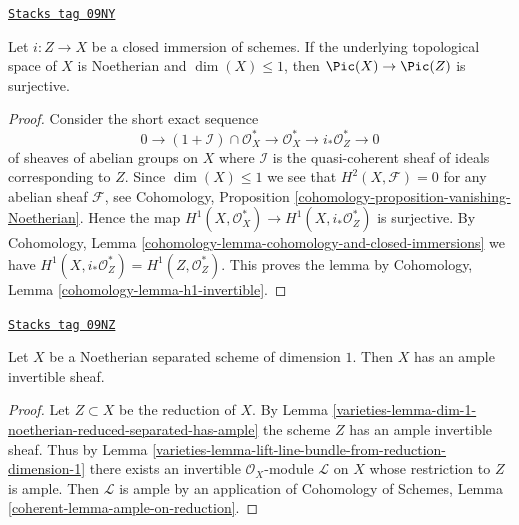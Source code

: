 \begin{lemma}
\label{varieties-lemma-lift-line-bundle-from-reduction-dimension-1}
\href{https://stacks.math.columbia.edu/tag/09NY}{\texttt{Stacks tag 09NY}}

Let $i : Z \to X$ be a closed immersion of schemes.
If the underlying topological space of $X$ is Noetherian and
$\dim(X) \leq 1$, then $\Pic(X) \to \Pic(Z)$ is surjective.
\end{lemma}

\begin{proof}
Consider the short exact sequence
$$
0 \to (1 + \mathcal{I}) \cap \mathcal{O}_X^* \to
\mathcal{O}^*_X \to i_*\mathcal{O}^*_Z \to 0
$$
of sheaves of abelian groups on $X$ where $\mathcal{I}$
is the quasi-coherent sheaf of ideals corresponding to $Z$.
Since $\dim(X) \leq 1$ we see that $H^2(X, \mathcal{F}) = 0$
for any abelian sheaf $\mathcal{F}$, see
Cohomology, Proposition \ref{cohomology-proposition-vanishing-Noetherian}.
Hence the map $H^1(X, \mathcal{O}^*_X) \to H^1(X, i_*\mathcal{O}_Z^*)$
is surjective. By
Cohomology, Lemma \ref{cohomology-lemma-cohomology-and-closed-immersions}
we have $H^1(X, i_*\mathcal{O}_Z^*) = H^1(Z, \mathcal{O}_Z^*)$.
This proves the lemma by
Cohomology, Lemma \ref{cohomology-lemma-h1-invertible}.
\end{proof}

\begin{proposition}
\label{varieties-proposition-dim-1-noetherian-separated-has-ample}
\href{https://stacks.math.columbia.edu/tag/09NZ}{\texttt{Stacks tag 09NZ}}

Let $X$ be a Noetherian separated scheme of dimension $1$.
Then $X$ has an ample invertible sheaf.
\end{proposition}

\begin{proof}

Let $Z \subset X$ be the reduction of $X$. By
Lemma \ref{varieties-lemma-dim-1-noetherian-reduced-separated-has-ample}
the scheme $Z$ has an ample invertible sheaf.
Thus by Lemma \ref{varieties-lemma-lift-line-bundle-from-reduction-dimension-1}
there exists an invertible $\mathcal{O}_X$-module $\mathcal{L}$
on $X$ whose restriction to $Z$ is ample.
Then $\mathcal{L}$ is ample by an application of
Cohomology of Schemes, Lemma \ref{coherent-lemma-ample-on-reduction}.
\end{proof}

